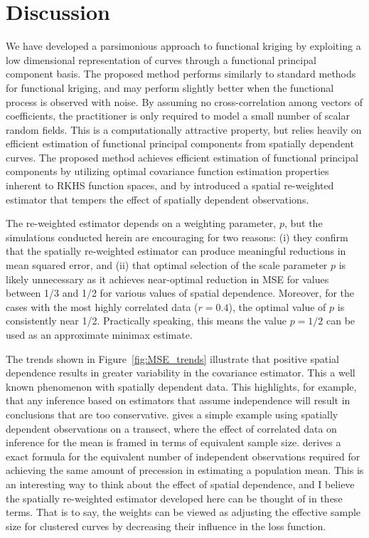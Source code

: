 
\section{Discussion} %
\label{sec:discussion}
 We have developed a parsimonious approach to functional kriging by exploiting a low dimensional representation of curves through a functional principal component basis. The proposed method performs similarly to standard methods for functional kriging, and may perform slightly better when the functional process is observed with noise. By assuming no cross-correlation among vectors of coefficients, the practitioner is only required to model a small number of scalar random fields. This is a computationally attractive property, but relies heavily on efficient estimation of functional principal components from spatially dependent curves.  The proposed method achieves efficient estimation of functional principal components by utilizing optimal covariance function estimation properties inherent to RKHS function spaces, and by introduced a spatial re-weighted estimator that tempers the effect of spatially dependent observations. 
 
 The re-weighted estimator depends on a weighting parameter, $p$, but the simulations conducted herein are encouraging for two reasons: (i) they confirm that the spatially re-weighted estimator can produce meaningful reductions in mean squared error, and (ii) that optimal selection of the scale parameter $p$ is likely unnecessary as it achieves near-optimal reduction in MSE for values between 1/3 and 1/2 for various values of spatial dependence. Moreover, for the cases with the most highly correlated data ($r = 0.4$), the optimal value of $p$ is consistently near 1/2. Practically speaking, this means the value $p = 1/2$ can be used as an approximate minimax estimate. 

The trends shown in Figure~\ref{fig:MSE_trends} illustrate that positive spatial dependence results in greater variability in the covariance estimator. This a well known phenomenon with spatially dependent data. This highlights, for example, that any inference based on estimators that assume independence will result in conclusions that are too conservative. \cite{cressie1993statistics} gives a simple example using spatially dependent observations on a transect, where the effect of correlated data on inference for the mean is framed in terms of equivalent sample size. \cite{cressie1993statistics} derives a exact formula for the equivalent number of independent observations required for achieving the same amount of precession in estimating a population mean. This is an interesting way to think about the effect of spatial dependence, and I believe the spatially re-weighted estimator developed here can be thought of in these terms. That is to say, the weights can be viewed as adjusting the effective sample size for clustered curves by decreasing their influence in the loss function. 

